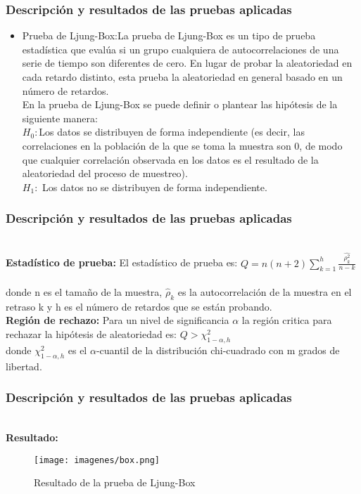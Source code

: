 \documentclass[12pt]{beamer}
\begin{document}
\begin{frame}
\frametitle{Descripción y resultados de las pruebas aplicadas}
\begin{itemize}
\item Prueba de Ljung-Box:La prueba de Ljung-Box es un tipo de prueba estadística que evalúa si un grupo cualquiera de autocorrelaciones de una serie de tiempo son diferentes de cero. En lugar de probar la aleatoriedad en cada retardo distinto, esta prueba la aleatoriedad en general basado en un número de retardos.
~\\En la prueba de Ljung-Box se puede definir o plantear las hipótesis de la siguiente manera:
~\\$H_{0}:$Los datos se distribuyen de forma independiente (es decir, las correlaciones en la población de la que se toma la muestra son 0, de modo que cualquier correlación observada en los datos es el resultado de la aleatoriedad del proceso de muestreo).
~\\$H_{1}:$ Los datos no se distribuyen de forma independiente.
\end{itemize}
\end{frame}

\begin{frame}
\frametitle{Descripción y resultados de las pruebas aplicadas}
~\\ \textbf{Estadístico de prueba:} El estadístico de prueba es: $Q=n(n+2)\sum\limits_{k=1}^{h}\frac{\hat{\rho_{k}^{2}}}{n-k}$
~\\ donde n es el tamaño de la muestra, $\displaystyle {\hat {\rho }}_{k}$  es la autocorrelación de la muestra en el retraso k y h es el número de retardos que se están probando.
~\\ \textbf{Región de rechazo:} Para un nivel de significancia $\alpha$ la región critica para rechazar la hipótesis de aleatoriedad es: $Q>\chi^{2}_{1-\alpha,h}$
~\\donde $\displaystyle \chi _{1-\alpha ,h}^{2}$ es el $\alpha$-cuantil de la distribución chi-cuadrado con m grados de libertad.
\end{frame}

\begin{frame}
\frametitle{Descripción y resultados de las pruebas aplicadas}
~\\ \textbf{Resultado:}\begin{figure}[!h]
    \begin{center}
        \texttt{[image: imagenes/box.png]}
        \caption{Resultado de la prueba de Ljung-Box}
        \label{fig:Densidad}
    \end{center}
\end{figure}
\end{frame}
\end{document}
